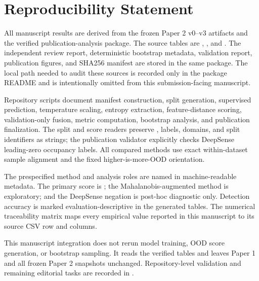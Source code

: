 \section{Reproducibility Statement}
\label{sec:reproducibility}

All manuscript results are derived from the frozen Paper 2 v0--v3 artifacts and the verified publication-analysis package. The source tables are , , and . The independent review report, deterministic bootstrap metadata, validation report, publication figures, and SHA256 manifest are stored in the same package. The local path needed to audit these sources is recorded only in the package README and is intentionally omitted from this submission-facing manuscript.

Repository scripts document manifest construction, split generation, supervised prediction, temperature scaling, entropy extraction, feature-distance scoring, validation-only fusion, metric computation, bootstrap analysis, and publication finalization. The split and score readers preserve , labels, domains, and split identifiers as strings; the publication validator explicitly checks DeepSense leading-zero occupancy labels. All compared methods use exact within-dataset sample alignment and the fixed higher-is-more-OOD orientation.

The prespecified method and analysis roles are named in machine-readable metadata. The primary score is \primarymethod; the Mahalanobis-augmented method is exploratory; and the DeepSense negation is post-hoc diagnostic only. Detection accuracy is marked evaluation-descriptive in the generated tables. The numerical traceability matrix maps every empirical value reported in this manuscript to its source CSV row and columns.

This manuscript integration does not rerun model training, OOD score generation, or bootstrap sampling. It reads the verified tables and leaves Paper 1 and all frozen Paper 2 snapshots unchanged. Repository-level validation and remaining editorial tasks are recorded in .

